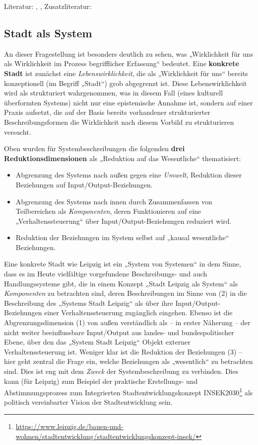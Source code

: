 \documentclass[11pt,a4paper]{article}
\begin{document}
Literatur: \cite{Holling2000}, \cite{Walker2004}, Zusatzliteratur:
\cite{Brand2007}

\subsection{Stadt als System}

An dieser Fragestellung ist besonders deutlich zu sehen, was „Wirklichkeit für
uns als Wirklichkeit im Prozess begriff\-licher Erfassung“ bedeutet. Eine
\textbf{konkrete Stadt} ist zunächst eine \emph{Lebenswirklichkeit}, die als
„Wirklichkeit für uns“ bereits konzeptionell (im Begriff „Stadt“) grob
abgegrenzt ist. Diese Lebenswirklichkeit wird als strukturiert wahrgenommen,
was in diesem Fall (eines kulturell überformten Systems) nicht nur eine
epistemische Annahme ist, sondern auf einer Praxis aufsetzt, die auf der Basis
bereits vorhandener strukturierter Beschreibungsformen die Wirklichkeit nach
diesem Vorbild zu strukturieren versucht.

Oben wurden für Systembeschreibungen die folgenden \textbf{drei
  Reduktionsdimensionen} als „Reduktion auf das Wesentliche“ thematisiert:
\begin{itemize}[noitemsep]
\item[1.] Abgrenzung des Systems nach außen gegen eine \emph{Umwelt},
  Reduktion dieser Beziehungen auf Input/Output-Beziehungen.
\item[2.] Abgrenzung des Systems nach innen durch Zusammenfassen von
  Teilbereichen als \emph{Komponenten}, deren Funktionieren auf eine
  „Verhaltenssteuerung“ über Input/Output-Be\-ziehungen reduziert wird.
\item[3.] Reduktion der Beziehungen im System selbst auf „kausal wesentliche“
  Beziehungen.
\end{itemize}
Eine konkrete Stadt wie Leipzig ist ein „System von Systemen“ in dem Sinne,
dass es im Heute vielfältige vorgefundene Beschreibungs- und auch
Handlungssysteme gibt, die in einem Konzept „Stadt Leipzig als System“ als
\emph{Komponenten} zu betrachten sind, deren Beschreibungen im Sinne von (2)
in die Beschreibung des „Systems Stadt Leipzig“ als über ihre
Input/Output-Beziehungen einer Verhaltenssteuerung zugänglich eingehen.
Ebenso ist die Abgrenzungsdimension (1) von außen verständlich als -- in
erster Näherung -- der nicht weiter beeinflussbare Input/Output aus landes-
und bundespolitischer Ebene, über den das „System Stadt Leipzig“ Objekt
externer Verhaltenssteuerung ist. Weniger klar ist die Reduktion der
Beziehungen (3) -- hier geht zentral die Frage ein, welche Beziehungen als
„wesentlich“ zu betrachten sind. Dies ist eng mit dem \emph{Zweck} der
Systembeschreibung zu verbinden. Dies kann (für Leipzig) zum Beispiel der
praktische Erstellungs- und Abstimmungsprozess zum Integrierten
Stadtentwicklungskonzept
INSEK2030\footnote{\url{https://www.leipzig.de/bauen-und-wohnen/stadtentwicklung/stadtentwicklungskonzept-insek/}}
als politisch vereinbarter Vision der Stadtentwicklung sein.
\end{document}
